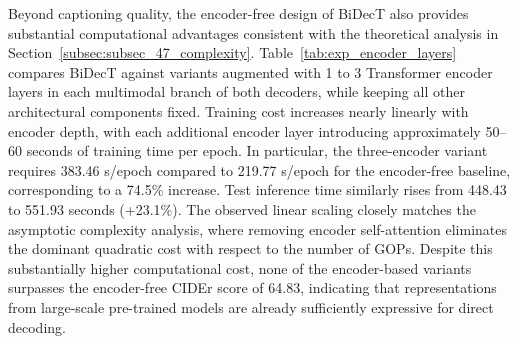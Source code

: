 
Beyond captioning quality, the encoder-free design of BiDecT also provides substantial computational advantages consistent with the theoretical analysis in Section~\ref{subsec:subsec_47_complexity}. Table~\ref{tab:exp_encoder_layers} compares BiDecT against variants augmented with 1 to 3 Transformer encoder layers in each multimodal branch of both decoders, while keeping all other architectural components fixed. Training cost increases nearly linearly with encoder depth, with each additional encoder layer introducing approximately 50–60 seconds of training time per epoch. In particular, the three-encoder variant requires 383.46 s/epoch compared to 219.77 s/epoch for the encoder-free baseline, corresponding to a 74.5\% increase. Test inference time similarly rises from 448.43 to 551.93 seconds (+23.1\%). The observed linear scaling closely matches the asymptotic complexity analysis, where removing encoder self-attention eliminates the dominant quadratic cost with respect to the number of GOPs. Despite this substantially higher computational cost, none of the encoder-based variants surpasses the encoder-free CIDEr score of 64.83, indicating that representations from large-scale pre-trained models are already sufficiently expressive for direct decoding.

